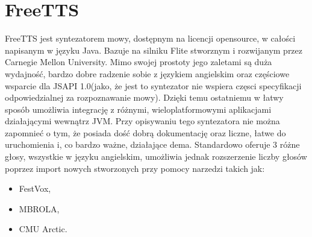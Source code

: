 \section{FreeTTS}
FreeTTS jest syntezatorem mowy, dostępnym na licencji opensource, w całości napisanym w języku Java. Bazuje na silniku Flite stworznym i rozwijanym przez Carnegie Mellon University. Mimo swojej prostoty jego zaletami są duża wydajność, bardzo dobre radzenie sobie z językiem angielskim oraz częściowe wsparcie dla JSAPI 1.0(jako, że jest to syntezator nie wspiera częsci specyfikacji odpowiedzialnej za rozpoznawanie mowy). Dzięki temu ostatniemu w łatwy sposób umożliwia integrację z różnymi, wieloplatformowymi aplikacjami działającymi wewnątrz JVM. Przy opisywaniu tego syntezatora nie można zapomnieć o tym, że posiada dość dobrą dokumentację oraz liczne, łatwe do uruchomienia i, co bardzo ważne, działające dema. Standardowo oferuje 3 różne głosy, wszystkie w języku angielskim, umożliwia jednak rozszerzenie liczby głosów poprzez import nowych stworzonych przy pomocy narzedzi takich jak:
	\begin{itemize}
		\item FestVox,
		\item MBROLA,
		\item CMU Arctic.
	\end{itemize}    

